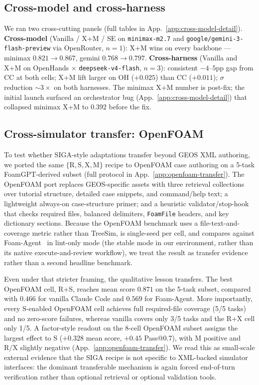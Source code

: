 \documentclass{article}
\begin{document}
\subsection{Cross-model and cross-harness}
\label{subsec:cross-cutting}

We ran two cross-cutting panels (full tables in App.~\ref{app:cross-model-detail}). \textbf{Cross-model} (Vanilla / X+M / SE on \texttt{minimax-m2.7} and \texttt{google/gemini-3-flash-preview} via OpenRouter, $n=1$): X+M wins on every backbone --- minimax $0.821 \to 0.867$, gemini $0.768 \to 0.797$. \textbf{Cross-harness} (Vanilla and X+M on OpenHands × \texttt{deepseek-v4-flash}, $n=3$): consistent $-4$--$5$pp gap from CC at both cells; X+M lift larger on OH ($+0.025$) than CC ($+0.011$); $\sigma$ reduction ${\sim}3\times$ on both harnesses. The minimax X+M number is post-fix; the initial launch surfaced an orchestrator bug (App.~\ref{app:cross-model-detail}) that collapsed minimax X+M to $0.392$ before the fix.

\subsection{Cross-simulator transfer: OpenFOAM}
\label{subsec:openfoam-transfer}

To test whether SIGA-style adaptations transfer beyond GEOS XML authoring, we ported the same $\{\mathrm{R,S,X,M}\}$ recipe to OpenFOAM case authoring on a 5-task FoamGPT-derived subset (full protocol in App.~\ref{app:openfoam-transfer}). The OpenFOAM port replaces GEOS-specific assets with three retrieval collections over tutorial structure, detailed case snippets, and command/help text; a lightweight always-on case-structure primer; and a heuristic validator/stop-hook that checks required files, balanced delimiters, \texttt{FoamFile} headers, and key dictionary sections. Because the OpenFOAM benchmark uses a file-text-and-coverage metric rather than TreeSim, is single-seed per cell, and compares against Foam-Agent~\citep{foamagent2025} in lint-only mode (the stable mode in our environment, rather than its native execute-and-review workflow), we treat the result as transfer evidence rather than a second headline benchmark.

Even under that stricter framing, the qualitative lesson transfers. The best OpenFOAM cell, R+S, reaches mean score $0.871$ on the 5-task subset, compared with $0.466$ for vanilla Claude Code and $0.569$ for Foam-Agent. More importantly, every $\mathrm{S}$-enabled OpenFOAM cell achieves full required-file coverage (5/5 tasks) and no zero-score failures, whereas vanilla covers only 3/5 tasks and the R+X cell only 1/5. A factor-style readout on the 8-cell OpenFOAM subset assigns the largest effect to $\mathrm{S}$ ($+0.328$ mean score, $+0.45$ Pass@0.7), with $\mathrm{M}$ positive and $\mathrm{R}/\mathrm{X}$ slightly negative (App.~\ref{app:openfoam-transfer}). We read this as small-scale external evidence that the SIGA recipe is not specific to XML-backed simulator interfaces: the dominant transferable mechanism is again forced end-of-turn verification rather than optional retrieval or optional validation tools.
\end{document}
